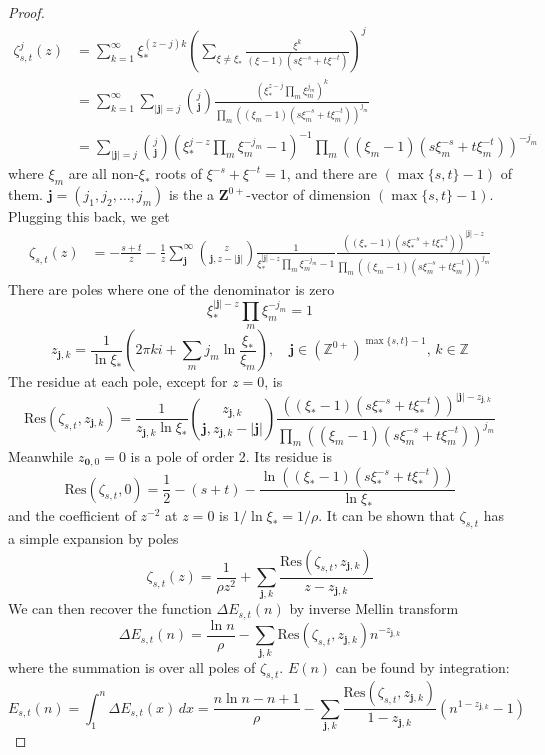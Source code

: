 \documentclass[]{article}
\begin{document}
\begin{proof}
\begin{align*}
	\zeta_{s,t}^j(z) &= \sum_{k=1}^{\infty} \xi_*^{(z-j)k} \left(\sum_{\xi\neq\xi_*} \frac{\xi^k}{(\xi - 1)(s\xi^{-s}+t\xi^{-t})} \right)^j \\
	&= \sum_{k=1}^{\infty} \sum_{|\mathbf{j}|=j} {j\choose\mathbf{j}} \frac{ \left(\xi_*^{z-j} \prod_m \xi_m^{j_m}  \right)^k  }{\prod_{m} \left((\xi_m - 1)(s\xi_m^{-s}+t\xi_m^{-t})\right)^{j_m}} \\
	&= \sum_{|\mathbf{j}|=j} {j\choose\mathbf{j}}  \left(\xi_*^{j-z}\prod_m \xi_m^{-j_m}   - 1\right)^{-1} \prod_{m} \left((\xi_m - 1)(s\xi_m^{-s}+t\xi_m^{-t})\right)^{-j_m}
\end{align*}
where $\xi_m$ are all non-$\xi_*$ roots of $\xi^{-s} + \xi^{-t} = 1$, and there are $(\max\{s, t\} - 1)$ of them.  $\mathbf{j} = (j_1,j_2,\dots,j_m)$ is the a $\mathbf{Z}^{0+}$-vector of dimension $(\max\{s, t\} - 1)$. Plugging this back, we get
\begin{align*}
	\zeta_{s,t}(z) &=-\frac{s+t}{z} - \frac{1}{z} \sum_{\mathbf{j}}^{\infty}  {z\choose{\mathbf{j},z-|\mathbf{j}|}}   \frac{1}{\xi_*^{|\mathbf{j}|-z}  \prod_m \xi_m^{-j_m}- 1}\frac{\left( (\xi_* - 1)(s\xi_*^{-s}+t\xi_*^{-t})\right)^{|\mathbf{j}|-z} } {\prod_{m} \left((\xi_m - 1)(s\xi_m^{-s}+t\xi_m^{-t})\right)^{j_m}}
\end{align*}
There are poles where one of the denominator is zero
\[
	\xi_*^{|\mathbf{j}|-z} \prod_m \xi_m^{-j_m}  = 1
\]
\[
z_{\mathbf{j},k} =  \frac{1}{\ln\xi_*}\left(2\pi k i  + \sum_m j_m \ln \frac{\xi_*}{\xi_m}\right) , \quad  \mathbf{j}\in(\mathbb{Z}^{0+})^{\max\{s, t\} - 1},\, k \in \mathbb{Z}
\]
The residue at each pole, except for $z = 0$, is
\[
\mathrm{Res}(\zeta_{s,t}, z_{\mathbf{j},k}) = \frac{1}{z_{\mathbf{j},k}\ln \xi_*}{z_{\mathbf{j},k}\choose{\mathbf{j},z_{\mathbf{j},k}-|\mathbf{j}|}} \frac{\left( (\xi_* - 1)(s\xi_*^{-s}+t\xi_*^{-t})\right)^{|\mathbf{j}|-z_{\mathbf{j},k}} } {\prod_{m} \left((\xi_m - 1)(s\xi_m^{-s}+t\xi_m^{-t})\right)^{j_m}}
\]
Meanwhile $z_{\mathbf{0},0} = 0$ is a pole of order 2. Its residue is
\[
\mathrm{Res}(\zeta_{s,t}, 0) = \frac{1}{2} - (s+t) - \frac{\ln\left((\xi_* - 1)(s\xi_*^{-s}+t\xi_*^{-t})\right)}{\ln\xi_*}
\]
and the coefficient of $z^{-2}$ at $z = 0$ is $1/\ln\xi_* = 1/\rho$. It can be shown that $\zeta_{s,t}$ has a simple expansion by poles
\[
\zeta_{s,t}(z) = \frac{1}{\rho z^2} + \sum_{\mathbf{j},k} \frac{\mathrm{Res}(\zeta_{s,t}, z_{\mathbf{j},k})}{z - z_{\mathbf{j},k}}
\]
We can then recover the function $\Delta E_{s,t}(n)$ by inverse Mellin transform
\[
\Delta E_{s,t}(n) = \frac{\ln n }{\rho} - \sum_{\mathbf{j},k} \mathrm{Res}(\zeta_{s,t}, z_{\mathbf{j},k}) n^{-z_{\mathbf{j},k}}
\]
where the summation is over all poles of $\zeta_{s,t}$. $E(n)$ can be found by integration:
\[
E_{s,t}(n) = \int_1^n \Delta E_{s,t}(x)\, dx = \frac{n\ln n -n + 1 }{\rho} - \sum_{\mathbf{j},k}  \frac{\mathrm{Res}(\zeta_{s,t}, z_{\mathbf{j},k})}{1-z_{\mathbf{j},k}}(n^{1-z_{\mathbf{j},k}} - 1 )
\]


\end{proof}
\end{document}
